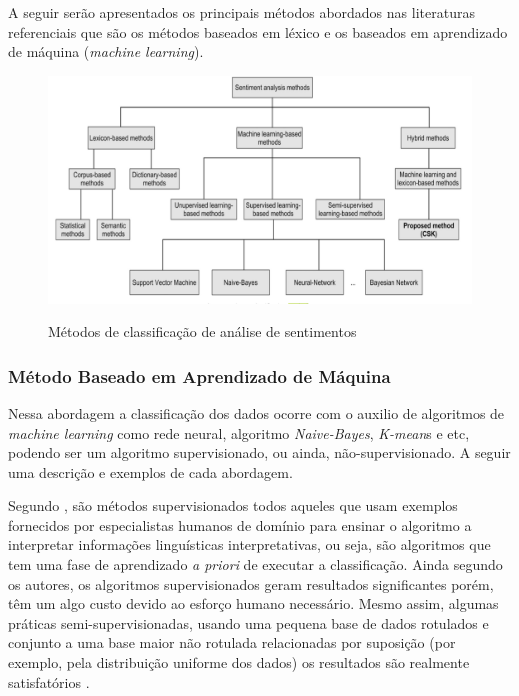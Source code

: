 A seguir serão apresentados os principais métodos abordados nas literaturas referenciais que são os métodos baseados em léxico e os baseados em  aprendizado de máquina (\textit{machine learning}).

\begin{figure}[!h]
\centering 
\caption{Métodos de classificação de análise de sentimentos}
\includegraphics[scale=0.70]{imagens/sentimentanalysismethods.png}
\label{fig:SAMethods}
\end{figure}
\newpage

\subsubsection{Método Baseado em Aprendizado de Máquina}

Nessa abordagem a classificação dos dados ocorre com o auxilio de algoritmos de \textit{machine learning} como rede neural, algoritmo \textit{Naive-Bayes}, \textit{K-mean}s e etc, podendo ser um algoritmo supervisionado, ou ainda, não-supervisionado. A seguir uma descrição e exemplos de cada abordagem.


Segundo , são métodos supervisionados todos aqueles que usam exemplos fornecidos por especialistas humanos de domínio para ensinar o algoritmo a interpretar informações linguísticas interpretativas, ou seja, são algoritmos que tem uma fase de aprendizado \textit{a priori} de executar a classificação. Ainda segundo os autores, os algoritmos supervisionados geram resultados significantes porém, têm um algo custo devido ao esforço humano necessário. Mesmo assim, algumas práticas semi-supervisionadas, usando uma pequena base de dados rotulados e conjunto a uma base maior não rotulada relacionadas por suposição (por exemplo, pela distribuição uniforme dos dados) os resultados são realmente satisfatórios \cite{TRUYENS2014153}.


